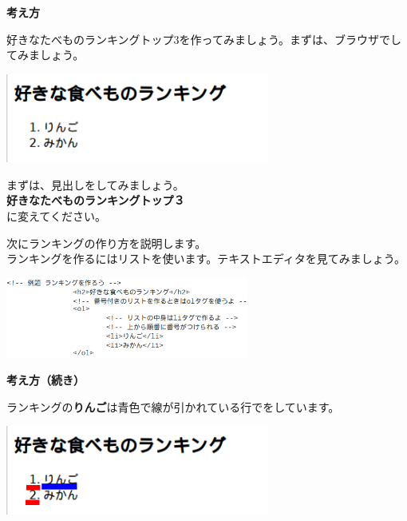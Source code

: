 \documentclass[a4paper,12pt]{jarticle}
\begin{document}
\bigskip


\bigskip

\textbf{考え方}



\bigskip



好きなたべものランキングトップ3を作ってみましょう。まずは、ブラウザでしてみましょう。


\bigskip

\includegraphics[width=0.65\textwidth]{textbook-img179.png}

\bigskip

まずは、見出しをしてみましょう。\\
\textbf{好きなたべものランキングトップ３}\\
に変えてください。


\bigskip

次にランキングの作り方を説明します。\\
ランキングを作るにはリストを使います。テキストエディタを見てみましょう。

\centering
\includegraphics[width=0.6\textwidth]{textbook-img180.png}

\clearpage
\flushleft
\textbf{考え方（続き）}


\bigskip


ランキングの\textbf{りんご}は青色で線が引かれている行でをしています。


\bigskip


\includegraphics[width=0.65\textwidth]{textbook-img182.png}
\end{document}
